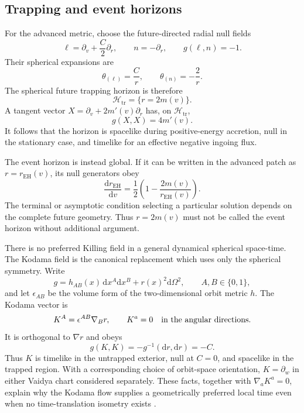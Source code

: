 \documentclass[11pt,a4paper]{article}
\theoremstyle{definition}
\theoremstyle{remark}
\newcommand{\HH}{\mathcal H}
\newcommand{\dd}{\mathrm d}
\begin{document}
	\subsection{Trapping and event horizons}
	
	For the advanced metric, choose the future-directed radial null fields
	\begin{equation}
		\ell=\partial_v+\frac{C}{2}\partial_r,
		\qquad n=-\partial_r,
		\qquad g(\ell,n)=-1.
	\end{equation}
	Their spherical expansions are
	\begin{equation}
		\theta_{(\ell)}=\frac{C}{r},
		\qquad
		\theta_{(n)}=-\frac{2}{r}.
	\end{equation}
	The spherical future trapping horizon is therefore
	\begin{equation}
		\HH_{\mathrm{tr}}=\{r=2m(v)\}.
		\label{eq:trapping-horizon}
	\end{equation}
	A tangent vector $X=\partial_v+2m'(v)\partial_r$ has, on
	$\HH_{\mathrm{tr}}$,
	\begin{equation}
		g(X,X)=4m'(v).
		\label{eq:horizon-signature}
	\end{equation}
	It follows that the horizon is spacelike during positive-energy accretion,
	null in the stationary case, and timelike for an effective negative ingoing
	flux.
	
	The event horizon is instead global.  If it can be written in the advanced
	patch as $r=r_{\mathrm{EH}}(v)$, its null generators obey
	\begin{equation}
		\frac{\dd r_{\mathrm{EH}}}{\dd v}
		=\frac12\left(1-\frac{2m(v)}{r_{\mathrm{EH}}(v)}\right).
		\label{eq:event-horizon-ode}
	\end{equation}
	The terminal or asymptotic condition selecting a particular solution depends
	on the complete future geometry.  Thus $r=2m(v)$ must not be called the event
	horizon without additional argument.
	
	There is no preferred Killing field in a general dynamical spherical
	space-time.  The Kodama field is the canonical replacement which uses only
	the spherical symmetry.  Write
	\begin{equation}
		g=h_{AB}(x)\,\dd x^A\dd x^B+r(x)^2\dd\Omega^2,
		\qquad A,B\in\{0,1\},
	\end{equation}
	and let $\epsilon_{AB}$ be the volume form of the two-dimensional orbit
	metric $h$.  The Kodama vector is
	\begin{equation}
		K^A=\epsilon^{AB}\nabla_Br,
		\qquad K^a=0\quad\hbox{in the angular directions}.
		\label{eq:Kodama-definition}
	\end{equation}
	It is orthogonal to $\nabla r$ and obeys
	\begin{equation}
		g(K,K)=-g^{-1}(\dd r,\dd r)=-C.
		\label{eq:Kodama-norm}
	\end{equation}
	Thus $K$ is timelike in the untrapped exterior, null at $C=0$, and spacelike
	in the trapped region.  With a corresponding choice of orbit-space
	orientation, $K=\partial_w$ in either Vaidya chart considered separately.
	These facts,
	together with $\nabla_aK^a=0$, explain why the Kodama flow supplies a
	geometrically preferred local time even when no time-translation isometry
	exists \cite{Kodama1980}.
	
\end{document}
